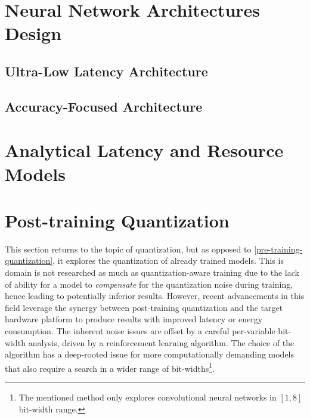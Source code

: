 \section{Neural Network Architectures Design}
\indo{|}
\indo{|}
\indo{|}

\subsection{Ultra-Low Latency Architecture}
\indo{|}
\indo{|}
\indo{|}
\indo{|}
\indo{|}
\indo{|}

\subsection{Accuracy-Focused Architecture}
\indo{|}
\indo{|}
\indo{|}
\indo{|}
\indo{|}
\indo{|}


\section{Analytical Latency and Resource Models}
\indo{|}
\indo{|}
\indo{|}
\indo{|}
\indo{|}
\indo{|}
\indo{|}
\indo{|}
\indo{|}
\indo{|}


\section{Post-training Quantization}\label{post-training-quantization}
This section returns to the topic of quantization, but as opposed to \cref{pre-training-quantization}, it explores the quantization of already trained models. This is domain is not researched as much as quantization-aware training due to the lack of ability for a model to \textit{compensate} for the quantization noise during training, hence leading to potentially inferior results. However, recent advancements in this field \cite{80-wang2019haq:} leverage the synergy between post-training quantization and the target hardware platform to produce results with improved latency or energy consumption. The inherent noise issues are offset by a careful per-variable bit-width analysis, driven by a reinforcement learning algorithm. The choice of the algorithm has a deep-rooted issue for more computationally demanding models that also require a search in a wider range of bit-widths\footnote{The mentioned method only explores convolutional neural networks in \([1, 8]\) bit-width range.}.

